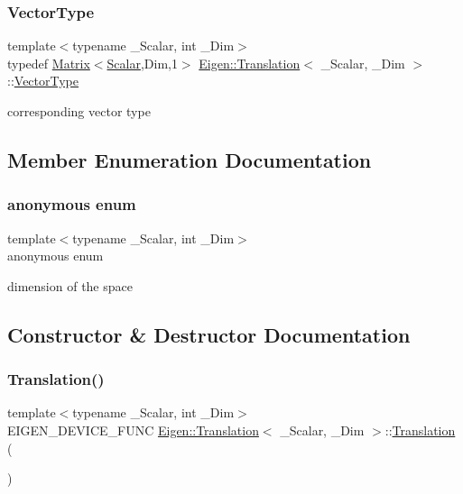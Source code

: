 \subsubsection{\texorpdfstring{VectorType}{VectorType}}
{\footnotesize\ttfamily template$<$typename \+\_\+\+Scalar, int \+\_\+\+Dim$>$ \\
typedef \mbox{\hyperlink{class_eigen_1_1_matrix}{Matrix}}$<$\mbox{\hyperlink{class_eigen_1_1_translation_ad596bf21ced4b902cc242205df486e21}{Scalar}},Dim,1$>$ \mbox{\hyperlink{class_eigen_1_1_translation}{Eigen\+::\+Translation}}$<$ \+\_\+\+Scalar, \+\_\+\+Dim $>$\+::\mbox{\hyperlink{class_eigen_1_1_translation_a339e17dfec5394ae563f62cca0df451f}{Vector\+Type}}}

corresponding vector type 

\subsection{Member Enumeration Documentation}
\mbox{\label{class_eigen_1_1_translation_a2197893c55c13c65eddb091977f34548}} 
\subsubsection{\texorpdfstring{anonymous enum}{anonymous enum}}
{\footnotesize\ttfamily template$<$typename \+\_\+\+Scalar, int \+\_\+\+Dim$>$ \\
anonymous enum}

dimension of the space 

\subsection{Constructor \& Destructor Documentation}
\mbox{\label{class_eigen_1_1_translation_a6220051bf3a13f8180ddefbae198493e}} 
\subsubsection{\texorpdfstring{Translation()}{Translation()}\hspace{0.1cm}{\footnotesize\ttfamily [1/3]}}
{\footnotesize\ttfamily template$<$typename \+\_\+\+Scalar, int \+\_\+\+Dim$>$ \\
E\+I\+G\+E\+N\+\_\+\+D\+E\+V\+I\+C\+E\+\_\+\+F\+U\+NC \mbox{\hyperlink{class_eigen_1_1_translation}{Eigen\+::\+Translation}}$<$ \+\_\+\+Scalar, \+\_\+\+Dim $>$\+::\mbox{\hyperlink{class_eigen_1_1_translation}{Translation}} (\begin{DoxyParamCaption}{ }\end{DoxyParamCaption})\hspace{0.3cm}{\ttfamily [inline]}}

